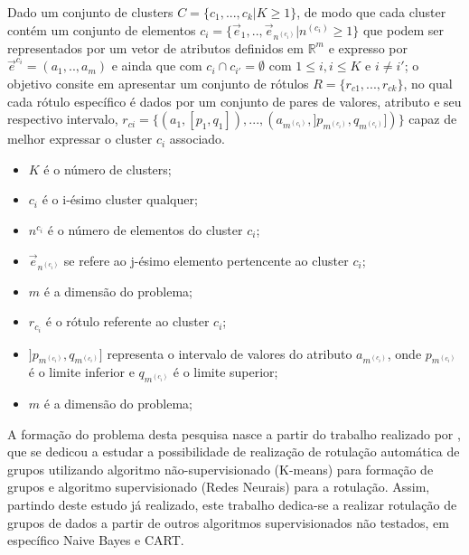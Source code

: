     \begin{teorema}
    Dado um conjunto de clusters ${C=\{c_1,...,c_k | K \geqslant 1\} }$, de modo que cada cluster contém um conjunto de elementos ${c_i=\{\vec{e}_1,..,\vec{e}_{n^{(c_i)}}|n^{(c_i)} \geqslant 1 \}}$ que podem ser representados por um vetor de atributos definidos em ${\mathbb{R}^m }$ e expresso por ${ \vec{e}^{c_i}=(a_1,..,a_m)  }$ e ainda que  com ${ c_i \cap c_{i'}=\emptyset }$ com ${ 1 \leqslant i, i \leqslant K  }$ e ${ i \neq i' }$; o objetivo consite em apresentar um conjunto de rótulos ${ R=\{ r_{c1},...,r_{ck} \} }$, no qual cada rótulo específico é dados por um conjunto de pares de valores, atributo e seu respectivo intervalo, ${ r_{ci}=\{ (a_1,[p_1,q_1]),...,(a_{m^{(c_i)}}, ]p_{m^{(c_i)}},q_{m^{(c_i)}}]) \} }$ capaz de melhor expressar o cluster ${c_i}$ associado.
        \begin{itemize}[noitemsep]
            \item ${K}$ é o número de clusters;
            \item ${c_i}$ é o i-ésimo cluster qualquer;
            \item ${n^{c_i}}$ é o número de elementos do cluster ${c_i}$;
            \item ${\vec{e}_{n^{(c_i)}}}$ se refere ao j-ésimo elemento pertencente ao cluster ${c_i}$;
            \item ${m}$ é a dimensão do problema;
            \item ${r_{c_i}}$ é o rótulo referente ao cluster ${c_i}$;
            \item ${]p_{m^{(c_i)}},q_{m^{(c_i)}}]}$ representa o intervalo de valores do atributo ${a_{m^{(c_i)}} }$, onde ${ p_{m^{(c_i)}} }$  é o limite inferior e ${ q_{m^{(c_i)}} }$ é o limite superior;
            \item ${m}$ é a dimensão do problema;
        \end{itemize}
    \label{teo:lopes:problema}
    \end{teorema}


A formação do problema desta pesquisa nasce a partir do trabalho realizado por ,  que se dedicou a estudar a possibilidade de realização de  rotulação automática de grupos utilizando  algoritmo não-supervisionado (K-means) para formação de grupos e algoritmo supervisionado (Redes Neurais) para a rotulação. Assim, partindo deste estudo já realizado, este trabalho dedica-se a realizar rotulação de grupos de dados a partir de outros algoritmos supervisionados não testados, em específico Naive Bayes e CART.

